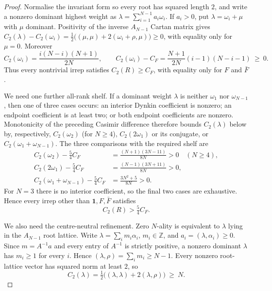\documentclass[11pt]{article}
\theoremstyle{plain}
\theoremstyle{definition}
\theoremstyle{remark}
\newcommand{\chk}[1]{}
\newcommand{\CF}{C_F}
\begin{document}
\begin{proof}
Normalise the invariant form so every root has squared length $2$, and write a
nonzero dominant highest weight as $\lambda=\sum_{i=1}^{N-1}a_i\omega_i$. If
$a_i>0$, put $\lambda=\omega_i+\mu$ with $\mu$ dominant. Positivity of the
inverse $A_{N-1}$ Cartan matrix gives
$C_2(\lambda)-C_2(\omega_i)=\tfrac12\bigl((\mu,\mu)+2(\omega_i+\rho,\mu)\bigr)\ge0$,
with equality only for $\mu=0$. Moreover
\[
  C_2(\omega_i)=\frac{i(N-i)(N+1)}{2N},\qquad
  C_2(\omega_i)-\CF=\frac{N+1}{2N}(i-1)(N-i-1)\ \ge\ 0 .
\]
Thus every nontrivial irrep satisfies $C_2(R)\ge \CF$, with equality only for
$F$ and $\bar F$.

We need one further all-rank shelf. If a dominant weight $\lambda$ is neither
$\omega_1$ nor $\omega_{N-1}$, then one of three cases occurs: an interior
Dynkin coefficient is nonzero; an endpoint coefficient is at least two; or
both endpoint coefficients are nonzero. Monotonicity of the preceding Casimir
difference therefore bounds $C_2(\lambda)$ below by, respectively,
$C_2(\omega_2)$ (for $N\ge4$), $C_2(2\omega_1)$ or its conjugate, or
$C_2(\omega_1+\omega_{N-1})$. The three comparisons with the required shelf
are
\begin{align}
  C_2(\omega_2)-\tfrac54\CF&=\frac{(N+1)(3N-11)}{8N}>0\quad(N\ge4),
    \label{eq:shelf1}\\
  C_2(2\omega_1)-\tfrac54\CF&=\frac{(N-1)(3N+11)}{8N}>0,\label{eq:shelf2}\\
  C_2(\omega_1+\omega_{N-1})-\tfrac54\CF&=\frac{3N^2+5}{8N}>0.\label{eq:shelf3}
\end{align}
For $N=3$ there is no interior coefficient, so the final two cases are
exhaustive. Hence every irrep other than $\mathbf 1,F,\bar F$ satisfies
\begin{equation}\label{eq:shelf}
  C_2(R)>\tfrac54\CF .
\end{equation}
\chk{every nontrivial irrep clears 5/4 C\_F, except the fundamental pair}

We also need the centre-neutral refinement. Zero $N$-ality is equivalent to
$\lambda$ lying in the $A_{N-1}$ root lattice. Write $\lambda=\sum_i m_i\alpha_i$,
$m_i\in\mathbb Z$, and $a_i=(\lambda,\alpha_i)\ge0$. Since $m=A^{-1}a$ and
every entry of $A^{-1}$ is strictly positive, a nonzero dominant $\lambda$ has
$m_i\ge1$ for every $i$. Hence $(\lambda,\rho)=\sum_i m_i\ge N-1$. Every
nonzero root-lattice vector has squared norm at least $2$, so
\begin{equation}\label{eq:neutral}
  C_2(\lambda)=\tfrac12\bigl((\lambda,\lambda)+2(\lambda,\rho)\bigr)\ \ge\ N .
\end{equation}


\end{proof}
\end{document}
